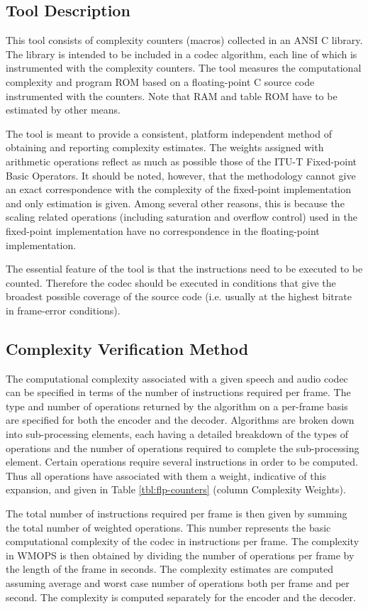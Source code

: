 \subsection{Tool Description }
This tool consists of complexity counters (macros) collected in an ANSI
C library. The library is intended to be included in a codec algorithm,
each line of which is instrumented with the complexity counters. The
tool measures the computational complexity and program ROM based on a
floating-point C source code instrumented with the counters. Note that
RAM and table ROM have to be estimated by other means.

The tool is meant to provide a consistent, platform independent method
of obtaining and reporting complexity estimates. The weights assigned
with arithmetic operations reflect as much as possible those of the
ITU-T Fixed-point Basic Operators. It should be noted, however, that the methodology
cannot give an exact correspondence with the complexity of the fixed-point implementation and only estimation is given. Among several other
reasons, this is because the scaling related operations (including
saturation and overflow control) used in the fixed-point implementation
have no correspondence in the floating-point implementation.

The essential feature of the tool is that the instructions need to be
executed to be counted. Therefore the codec should be executed in
conditions that give the broadest possible coverage of the source code
(i.e. usually at the highest bitrate in frame-error conditions).

\subsection{Complexity Verification Method}
The computational complexity associated with a given speech and audio
codec can be specified in terms of the number of instructions required
per frame. The type and number of operations returned by the algorithm
on a per-frame basis are specified for both the encoder and the
decoder. Algorithms are broken down into sub-processing elements, each
having a detailed breakdown of the types of operations and the number
of operations required to complete the sub-processing element. Certain
operations require several instructions in order to be computed. Thus
all operations have associated with them a weight, indicative of this
expansion, and given in Table \ref{tbl:flp-counters} (column
Complexity Weights).

The total number of instructions required per frame is then given by
summing the total number of weighted operations. This number represents
the basic computational complexity of the codec in instructions per
frame. The complexity in WMOPS is then obtained by dividing the number
of operations per frame by the length of the frame in seconds. The
complexity estimates are computed assuming average and worst case
number of operations both per frame and per second. The complexity
is computed separately for the encoder and the decoder.

